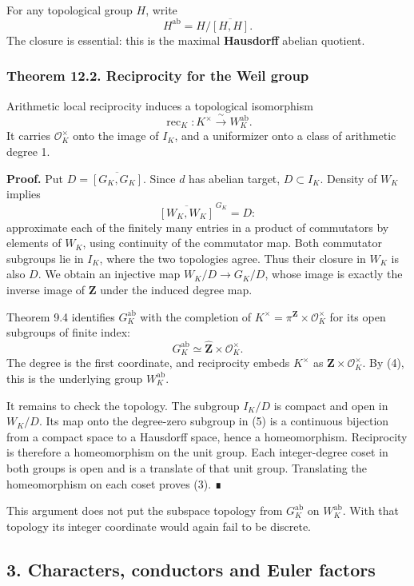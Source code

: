 \documentclass[11pt,a4paper]{article}
\begin{document}
For any topological group \(H\), write \[
H^{\mathrm{ab}}=H/\overline{[H,H]}.
\] The closure is essential: this is the maximal \textbf{Hausdorff}
abelian quotient.

\subsubsection{Theorem 12.2. Reciprocity for the Weil
group}\label{theorem-12.2.-reciprocity-for-the-weil-group}

Arithmetic local reciprocity induces a topological isomorphism \[
\operatorname{rec}_K:K^\times\xrightarrow{\ \sim\ }W_K^{\mathrm{ab}}.
\tag{3}
\] It carries \(\mathcal O_K^\times\) onto the image of \(I_K\), and a
uniformizer onto a class of arithmetic degree 1.

\textbf{Proof.} Put \(D=\overline{[G_K,G_K]}\). Since \(d\) has abelian
target, \(D\subset I_K\). Density of \(W_K\) implies \[
\overline{[W_K,W_K]}^{\,G_K}=D:
\tag{4}
\] approximate each of the finitely many entries in a product of
commutators by elements of \(W_K\), using continuity of the commutator
map. Both commutator subgroups lie in \(I_K\), where the two topologies
agree. Thus their closure in \(W_K\) is also \(D\). We obtain an
injective map \(W_K/D\to G_K/D\), whose image is exactly the inverse
image of \(\mathbf Z\) under the induced degree map.

Theorem 9.4 identifies \(G_K^{\mathrm{ab}}\) with the completion of
\(K^\times=\pi^{\mathbf Z}\times\mathcal O_K^\times\) for its open
subgroups of finite index: \[
G_K^{\mathrm{ab}}\simeq\widehat{\mathbf Z}\times\mathcal O_K^\times.
\tag{5}
\] The degree is the first coordinate, and reciprocity embeds
\(K^\times\) as \(\mathbf Z\times\mathcal O_K^\times\). By (4), this is
the underlying group \(W_K^{\mathrm{ab}}\).

It remains to check the topology. The subgroup \(I_K/D\) is compact and
open in \(W_K/D\). Its map onto the degree-zero subgroup in (5) is a
continuous bijection from a compact space to a Hausdorff space, hence a
homeomorphism. Reciprocity is therefore a homeomorphism on the unit
group. Each integer-degree coset in both groups is open and is a
translate of that unit group. Translating the homeomorphism on each
coset proves (3). ∎

This argument does not put the subspace topology from
\(G_K^{\mathrm{ab}}\) on \(W_K^{\mathrm{ab}}\). With that topology its
integer coordinate would again fail to be discrete.

\subsection{3. Characters, conductors and Euler
factors}\label{characters-conductors-and-euler-factors}
\end{document}
